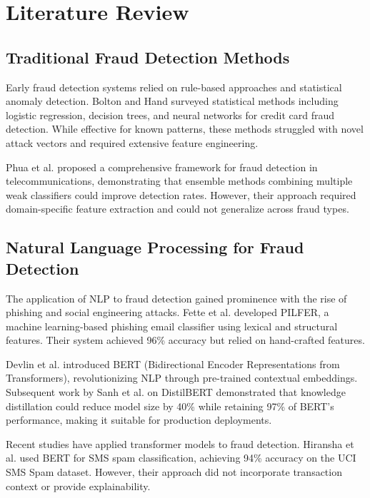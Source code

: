 \section{Literature Review}

\subsection{Traditional Fraud Detection Methods}

Early fraud detection systems relied on rule-based approaches and statistical anomaly detection. Bolton and Hand \cite{bolton2002statistical} surveyed statistical methods including logistic regression, decision trees, and neural networks for credit card fraud detection. While effective for known patterns, these methods struggled with novel attack vectors and required extensive feature engineering.

Phua et al. \cite{phua2010fraud} proposed a comprehensive framework for fraud detection in telecommunications, demonstrating that ensemble methods combining multiple weak classifiers could improve detection rates. However, their approach required domain-specific feature extraction and could not generalize across fraud types.

\subsection{Natural Language Processing for Fraud Detection}

The application of NLP to fraud detection gained prominence with the rise of phishing and social engineering attacks. Fette et al. \cite{fette2007learning} developed PILFER, a machine learning-based phishing email classifier using lexical and structural features. Their system achieved 96\% accuracy but relied on hand-crafted features.

Devlin et al. \cite{devlin2019bert} introduced BERT (Bidirectional Encoder Representations from Transformers), revolutionizing NLP through pre-trained contextual embeddings. Subsequent work by Sanh et al. \cite{sanh2019distilbert} on DistilBERT demonstrated that knowledge distillation could reduce model size by 40\% while retaining 97\% of BERT's performance, making it suitable for production deployments.

Recent studies have applied transformer models to fraud detection. Hiransha et al. \cite{hiransha2021deep} used BERT for SMS spam classification, achieving 94\% accuracy on the UCI SMS Spam dataset. However, their approach did not incorporate transaction context or provide explainability.

